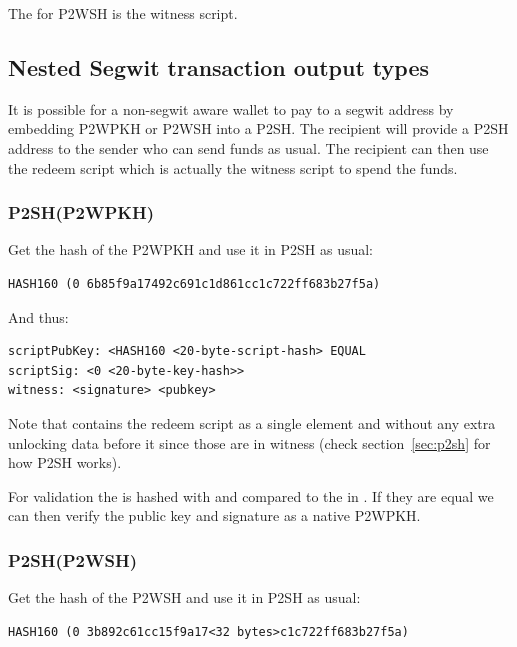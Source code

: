 The  for P2WSH is the witness script.


\subsection*{Nested Segwit transaction output types}
It is possible for a non-segwit aware wallet to pay to a segwit address by embedding P2WPKH or P2WSH into a P2SH. The recipient will provide a P2SH address to the sender who can send funds as usual. The recipient can then use the redeem script which is actually the witness script to spend the funds.

\subsubsection*{P2SH(P2WPKH)}
Get the hash of the P2WPKH  and use it in P2SH as usual:

\begin{emphbox}
\begin{lstlisting}[style=Pseudomath]
HASH160 (0 6b85f9a17492c691c1d861cc1c722ff683b27f5a)
\end{lstlisting}
\end{emphbox}

And thus:

\begin{emphbox}
\begin{lstlisting}[style=Pseudomath]
scriptPubKey: <HASH160 <20-byte-script-hash> EQUAL
scriptSig: <0 <20-byte-key-hash>>
witness: <signature> <pubkey>
\end{lstlisting}
\end{emphbox}

Note that  contains the redeem script as a single element and without any extra unlocking data before it since those are in witness (check section~\ref{sec:p2sh} for how P2SH works). 

For validation the  is hashed with  and compared to the  in . If they are equal we can then verify the public key and signature as a native P2WPKH.


\subsubsection*{P2SH(P2WSH)}
Get the hash of the P2WSH  and use it in P2SH as usual:

\begin{emphbox}
\begin{lstlisting}[style=Pseudomath]
HASH160 (0 3b892c61cc15f9a17<32 bytes>c1c722ff683b27f5a)
\end{lstlisting}
\end{emphbox}

